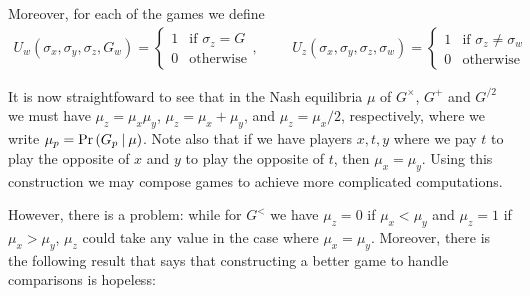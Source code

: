 \documentclass{article}
\begin{document}
Moreover, for each of the games we define
\begin{align*}
  U_w(\sigma_x,\sigma_y,\sigma_z, G_w) = \begin{cases}
    1 & \text{if } \sigma_z= G \\
    0 & \text{otherwise}
  \end{cases}
  , \hspace{1cm}
  U_z(\sigma_x,\sigma_y,\sigma_z,\sigma_w) = \begin{cases}
    1 & \text{if }\sigma_z\neq\sigma_w\\
    0 & \text{otherwise}
  \end{cases}
\end{align*}

It is now straightfoward to see that in the Nash
equilibria $\mu$ of $G^\times$, $G^+$ and $G^{/2}$ we must have $\mu_z =
\mu_x\mu_y$, $\mu_z = \mu_x + \mu_y$, and $\mu_z = \mu_x / 2$, respectively,
where we write $\mu_p = \Pr\left({{G_p}\:|\:\mu}\right)$. Note also that if we have
players $x,t,y$ where we pay $t$ to play the opposite of $x$ and
$y$ to play the opposite of $t$, then $\mu_x=\mu_y$. Using this
construction we may compose games to achieve more complicated
computations.

However, there is a problem: while for $G^<$ we have
$\mu_z = 0$ if $\mu_x<\mu_y$ and $\mu_z = 1$ if $\mu_x>\mu_y$,
$\mu_z$ could take any value in the case where $\mu_x=\mu_y$.
Moreover, there is the following result that says that constructing
a better game to handle comparisons is hopeless:
\end{document}
